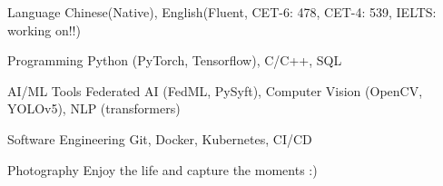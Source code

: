 

\begin{cvskills}
	
\cvskill
{Language} %
{Chinese(Native), English(Fluent, CET-6: 478, CET-4: 539, IELTS: working on!!)} %

\cvskill
{Programming} %
{Python (PyTorch, Tensorflow), C/C++, SQL} %

\cvskill
{AI/ML Tools} %
{Federated AI (FedML, PySyft), Computer Vision (OpenCV, YOLOv5), NLP (transformers)} %

\cvskill
{Software Engineering} %
{Git, Docker, Kubernetes, CI/CD} %

\cvskill
{Photography} %
{Enjoy the life and capture the moments :)} %


\end{cvskills}
